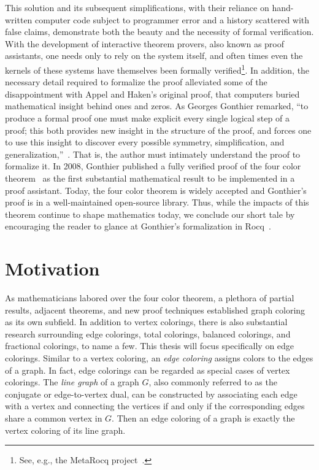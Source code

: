 This solution and its subsequent simplifications, with their reliance on hand-written computer code subject to programmer error and a history scattered with false claims, demonstrate both the beauty and the necessity of formal verification. With the development of interactive theorem provers, also known as proof assistants, one needs only to rely on the system itself, and often times even the kernels of these systems have themselves been formally verified\footnote{See, e.g., the MetaRocq project~\cite{meta}.}. In addition, the necessary detail required to formalize the proof alleviated some of the disappointment with Appel and Haken's original proof, that computers buried mathematical insight behind ones and zeros. As Georges Gonthier remarked, ``to produce a formal proof one must make explicit every single logical step of a proof; this both provides new insight in the structure of the proof, and forces one to use this insight to discover every possible symmetry, simplification, and generalization,''~\cite{Gonthier}. That is, the author must intimately understand the proof to formalize it. In 2008, Gonthier published a fully verified proof of the four color theorem~\cite{Gonthier} as the first substantial mathematical result to be implemented in a proof assistant. Today, the four color theorem is widely accepted and Gonthier's proof is in a well-maintained open-source library. Thus, while the impacts of this theorem continue to shape mathematics today, we conclude our short tale by encouraging the reader to glance at Gonthier's formalization in Rocq~\cite{4CRocq}. 

\section{Motivation}\label{section motivation}
As mathematicians labored over the four color theorem, a plethora of partial results, adjacent theorems, and new proof techniques established graph coloring as its own subfield. In addition to vertex colorings, there is also substantial research surrounding edge colorings, total colorings, balanced colorings, and fractional colorings, to name a few. This thesis will focus specifically on edge colorings. Similar to a vertex coloring, an \textit{edge coloring} assigns colors to the edges of a graph. In fact, edge colorings can be regarded as special cases of vertex colorings. The \textit{line graph} of a graph $G$, also commonly referred to as the conjugate or edge-to-vertex dual, can be constructed by associating each edge with a vertex and connecting the vertices if and only if the corresponding edges share a common vertex in $G.$ Then an edge coloring of a graph is exactly the vertex coloring of its line graph. 

